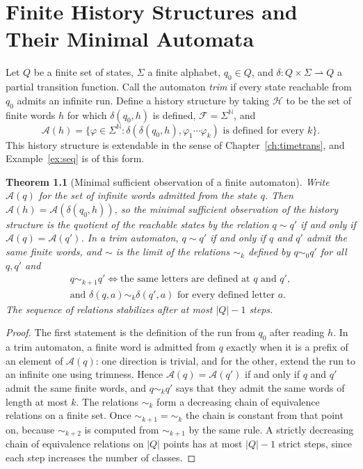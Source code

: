 \documentclass[11pt,oneside]{book}
\newtheorem{theorem}{Theorem}[chapter]
\theoremstyle{definition}
\theoremstyle{remark}
\newcommand{\Hist}{\mathcal{H}}
\newcommand{\Fut}{\mathcal{F}}
\newcommand{\Adm}{\mathcal{A}}
\newcommand{\N}{\mathbb{N}}
\begin{document}
\chapter{Finite History Structures and Their Minimal Automata}\label{ch:automata}

Let $Q$ be a finite set of states, $\Sigma$ a finite alphabet, $q_0\in Q$, and $\delta\colon Q\times\Sigma\rightharpoonup Q$ a partial transition function. Call the automaton \emph{trim} if every state reachable from $q_0$ admits an infinite run. Define a history structure by taking $\Hist$ to be the set of finite words $h$ for which $\delta(q_0,h)$ is defined, $\Fut=\Sigma^{\N}$, and
\[
\Adm(h)=\{\varphi\in\Sigma^{\N} : \delta(\delta(q_0,h),\varphi_1\cdots\varphi_k)\text{ is defined for every }k\}.
\]
This history structure is extendable in the sense of Chapter~\ref{ch:timetrans}, and Example~\ref{ex:seq} is of this form.

\begin{theorem}[Minimal sufficient observation of a finite automaton]\label{thm:moore}
Write $\Adm(q)$ for the set of infinite words admitted from the state $q$. Then $\Adm(h)=\Adm(\delta(q_0,h))$, so the minimal sufficient observation of the history structure is the quotient of the reachable states by the relation $q\sim q'$ if and only if $\Adm(q)=\Adm(q')$. In a trim automaton, $q\sim q'$ if and only if $q$ and $q'$ admit the same finite words, and $\sim$ is the limit of the relations $\sim_k$ defined by $q\sim_0 q'$ for all $q,q'$ and
\begin{multline*}
q\sim_{k+1}q' \iff \text{the same letters are defined at } q \text{ and } q', \\ \text{and } \delta(q,a)\sim_k\delta(q',a)\text{ for every defined letter } a .
\end{multline*}
The sequence of relations stabilizes after at most $|Q|-1$ steps.
\end{theorem}

\begin{proof}
The first statement is the definition of the run from $q_0$ after reading $h$. In a trim automaton, a finite word is admitted from $q$ exactly when it is a prefix of an element of $\Adm(q)$: one direction is trivial, and for the other, extend the run to an infinite one using trimness. Hence $\Adm(q)=\Adm(q')$ if and only if $q$ and $q'$ admit the same finite words, and $q\sim_k q'$ says that they admit the same words of length at most $k$. The relations $\sim_k$ form a decreasing chain of equivalence relations on a finite set. Once $\sim_{k+1}=\sim_k$ the chain is constant from that point on, because $\sim_{k+2}$ is computed from $\sim_{k+1}$ by the same rule. A strictly decreasing chain of equivalence relations on $|Q|$ points has at most $|Q|-1$ strict steps, since each step increases the number of classes.
\end{proof}
\end{document}
